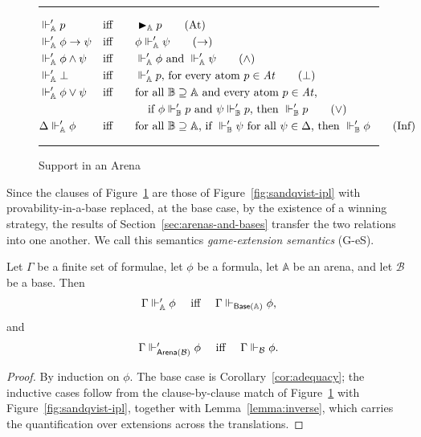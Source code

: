 \documentclass{lipics-v2021}
\newcommand{\supp}[1]{\Vdash_{#1}}
\newcommand{\arenasupp}[1]{\Vdash_{#1}'}  %
\newcommand{\wstrat}[1]{\blacktriangleright_{#1}}            %
\newcommand{\base}[1]{\mathcal{#1}}                    %
\newcommand{\arena}[1]{\mathbb{#1}}                     %
\newcommand{\tobase}[1]{\mathrel{\textsf{Base}}(#1)}            %
\newcommand{\toarena}[1]{\mathrel{\textsf{Arena}}(#1)}           %
\newcommand{\At}{\mathit{At}}                           %
\begin{document}
\begin{figure}[t]
    \hrule
    \begin{align}
        &\arenasupp{\arena{A}} p
            &&\text{iff} \qquad\wstrat{\arena{A}} p
            \tag{At} \\
        &\arenasupp{\arena{A}} \phi \to \psi
            &&\text{iff} \qquad\phi \arenasupp{\arena{A}} \psi
            \tag{$\to$} \\
        &\arenasupp{\arena{A}} \phi \land \psi
            &&\text{iff} \qquad \arenasupp{\arena{A}} \phi \text{ and } \arenasupp{\arena{A}} \psi
            \tag{$\land$} \\
        &\arenasupp{\arena{A}} \bot
            &&\text{iff} \qquad\arenasupp{\arena{A}} p \text{, for every atom } p \in \At
            \tag{$\bot$} \\
        &\arenasupp{\arena{A}} \phi \lor \psi
            &&\text{iff} \qquad\text{for all } \arena{B} \supseteq \arena{A} \text{ and every atom } p \in \At \text{,} \notag \\
            & && \qquad \qquad\text{if } \phi \arenasupp{\arena{B}} p \text{ and } \psi \arenasupp{\arena{B}} p \text{, then } \arenasupp{\arena{B}} p
            \tag{$\lor$} \\
        &\Delta \arenasupp{\arena{A}} \phi
            &&\text{iff} \qquad \text{for all } \arena{B} \supseteq \arena{A} \text{, if } \arenasupp{\arena{B}} \psi \text{ for all } \psi \in \Delta \text{, then } \arenasupp{\arena{B}} \phi
            \tag{Inf}
    \end{align} 
    \caption{Support in an Arena}
    \hrule
    \label{fig:arena-support}
\end{figure}
 
Since the clauses of Figure~\ref{fig:arena-support} are those of
Figure~\ref{fig:sandqvist-ipl} with provability-in-a-base replaced, at the
base case, by the existence of a winning strategy, the results of
Section~\ref{sec:arenas-and-bases} transfer the two relations into one
another. We call this semantics  \emph{game-extension
semantics} (G-eS).
\begin{corollary} \label{cor:supp_equivalence}
Let $\Gamma$ be a finite set of formulae, let $\phi$ be a formula, let $\arena{A}$ be an arena, and let $\base{B}$ be a base. Then
\[
\mbox{$\Gamma \arenasupp{\arena{A}} \phi$ \quad iff \quad $\Gamma \supp{\tobase{\arena{A}}} \phi$,}
\]
and
\[
\mbox{$\Gamma \arenasupp{\toarena{\base{B}}} \phi$ \quad iff \quad $\Gamma \supp{\base{B}} \phi$.}
\]
\end{corollary}
\begin{proof}
    By induction on $\phi$. The base case is
    Corollary~\ref{cor:adequacy}; the inductive cases follow from the
    clause-by-clause match of Figure~\ref{fig:arena-support} with
    Figure~\ref{fig:sandqvist-ipl}, together with Lemma~\ref{lemma:inverse},
    which carries the quantification over extensions across the translations.
\end{proof}
 
\end{document}
